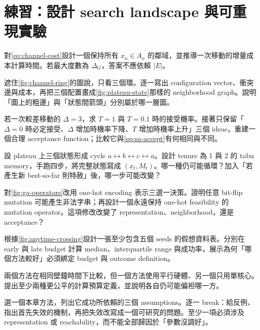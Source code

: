 \documentclass[11pt,a4paper,oneside,openany]{book}
\begin{document}
\section{練習：設計 search landscape 與可重現實驗}
\begin{exercise}
對\cref{eq:channel-cost}設計一個保持所有 $x_u\in A_u$ 的鄰域，並推導一次移動的增量成本計算時間。若最大度數為 $\Delta_G$，答案不應依賴 $|E|$。
\end{exercise}
\begin{exercise}
遮住\cref{fig:channel-ring}的圖說，只看三個環。逐一寫出 configuration vector、衝突邊與成本，再把三個配置畫成\cref{fig:plateau-state}那樣的 neighborhood graph。說明「圖上的粗邊」與「狀態間箭頭」分別屬於哪一層圖。
\end{exercise}
\begin{exercise}
若一次較差移動的 $\Delta=3$，求 $T=1$ 與 $T=0.1$ 時的接受機率。接著只保留「$\Delta=0$ 時必定接受、$\Delta$ 增加時機率下降、$T$ 增加時機率上升」三個 ideas，重建一個合理 acceptance function；比較它與\cref{eq:sa-accept}有何相同與不同。
\end{exercise}
\begin{exercise}
設 plateau 上三個狀態形成 cycle $a\leftrightarrow b\leftrightarrow c\leftrightarrow a$。設計 tenure 為 1 與 2 的 tabu memory，手跑四步，將完整狀態寫成 $(x_t,M_t)$。哪一種仍可能循環？加入「若產生新 best-so-far 則特赦」後，哪一步可能改變？
\end{exercise}
\begin{exercise}
對\cref{fig:ga-operators}改用 one-hot encoding 表示三選一決策。證明任意 bit-flip mutation 可能產生非法字串；再設計一個永遠保持 one-hot feasibility 的 mutation operator。這項修改改變了 representation、neighborhood，還是 acceptance？
\end{exercise}
\begin{exercise}
根據\cref{fig:anytime-crossing}設計一張至少包含五個 seeds 的假想資料表。分別在 early 與 late budget 計算 median、interquartile range 與成功率，展示為何「哪個方法較好」必須綁定 budget 與 outcome definition。
\end{exercise}
\begin{exercise}
兩個方法在相同壁鐘時間下比較，但一個方法使用平行硬體、另一個只用單核心。提出至少兩種更公平的計算預算定義，並說明各自仍可能偏袒哪一方。
\end{exercise}
\begin{exercise}
選一個本章方法，列出它成功所依賴的三個 assumptions。逐一 break：給反例、指出首先失效的機制，再把失效改寫成一個可研究的問題。至少一項必須涉及 representation 或 reachability，而不能全部歸因於「參數沒調好」。
\end{exercise}
\end{document}
